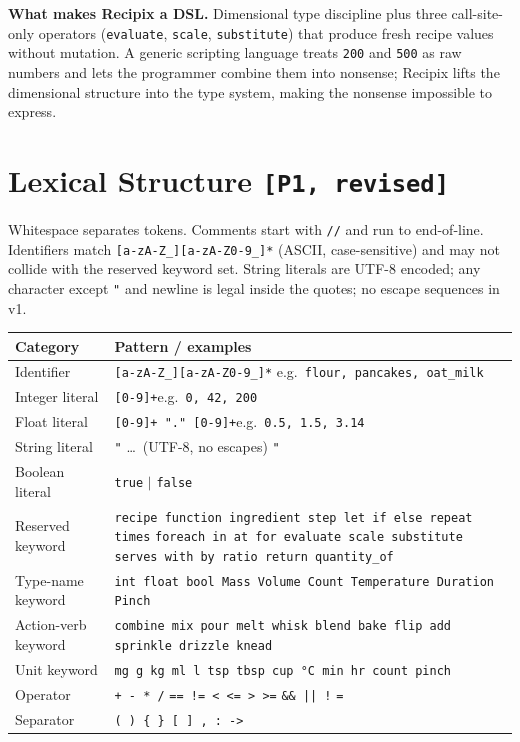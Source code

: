 \documentclass[11pt,a4paper]{article}
\begin{document}
\medskip
\noindent\textbf{What makes Recipix a DSL.} Dimensional type discipline
plus three call-site-only operators (\texttt{evaluate}, \texttt{scale},
\texttt{substitute}) that produce fresh recipe values without mutation.
A generic scripting language treats \texttt{200} and \texttt{500} as raw
numbers and lets the programmer combine them into nonsense; Recipix lifts
the dimensional structure into the type system, making the nonsense
impossible to express.


\section{Lexical Structure \texttt{[P1, revised]}}

Whitespace separates tokens. Comments start with \texttt{//} and run to
end-of-line. Identifiers match \texttt{[a-zA-Z\_][a-zA-Z0-9\_]*} (ASCII,
case-sensitive) and may not collide with the reserved keyword set.
String literals are UTF-8 encoded; any character except \texttt{"} and
newline is legal inside the quotes; no escape sequences in v1.

\begin{center}
\begin{tabular}{@{}lp{}@{}}
\toprule
\textbf{Category} & \textbf{Pattern / examples} \\
\midrule
Identifier        & \texttt{[a-zA-Z\_][a-zA-Z0-9\_]*} \quad e.g.\ \texttt{flour, pancakes, oat\_milk} \\
Integer literal   & \texttt{[0-9]+}\quad e.g.\ \texttt{0, 42, 200} \\
Float literal     & \texttt{[0-9]+ "." [0-9]+}\quad e.g.\ \texttt{0.5, 1.5, 3.14} \\
String literal    & \verb|"| \dots\ (UTF-8, no escapes) \verb|"| \\
Boolean literal   & \texttt{true} $\mid$ \texttt{false} \\
Reserved keyword  & \texttt{recipe function ingredient step let if else repeat times}
                    \texttt{foreach in at for evaluate scale substitute}
                    \texttt{serves with by ratio return quantity\_of} \\
Type-name keyword & \texttt{int float bool Mass Volume Count Temperature Duration Pinch} \\
Action-verb keyword
                  & \texttt{combine mix pour melt whisk blend bake flip add sprinkle drizzle knead} \\
Unit keyword      & \texttt{mg g kg ml l tsp tbsp cup °C min hr count pinch} \\
Operator          & \texttt{+ - * /} \quad \texttt{== != < <= > >=} \quad \texttt{\&\& || !} \quad \texttt{=} \\
Separator         & \texttt{( ) \{ \} [ ] , : ->} \\
\bottomrule
\end{tabular}
\end{center}
\end{document}
